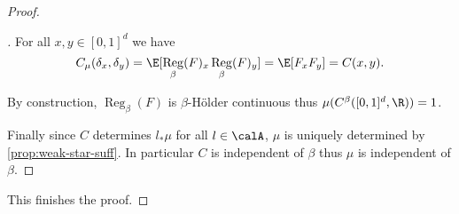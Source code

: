 \documentclass[fontsize=12pt, DIV=10]{scrreprt}
\theoremstyle{mydefn}
\theoremstyle{remark}
\newenvironment{subproof}[1][\proofname]{%
  \renewcommand{\qedsymbol}{$\blacksquare$}%
  \begin{proof}[#1]%
}{%
  \end{proof}%
}
\DeclareMathOperator{\reg}{Reg}
\begin{document}
\begin{proof}
\begin{subproof}
		For all $x, y \in [0, 1]^d$ we have
		\begin{equation}
			C_{\mu}(\delta_x, \delta_y) = \E[\reg_{\beta}(F)_x \reg_{\beta}(F)_y]
			= \E[F_x F_y] = C(x, y).
		\end{equation}

		By construction, $\reg_{\beta}(F)$ is $\beta$-H\"older continuous thus $\mu(C^{\beta}(\unitbox, \R)) = 1$.

		Finally since $C$ determines $l_* \mu$ for all $l \in \calA$, $\mu$ is uniquely determined by \vref{prop:weak-star-suff}. In particular $C$ is independent of $\beta$ thus $\mu$ is independent of $\beta$.
	\end{subproof}

	This finishes the proof.
\end{proof}
\end{document}
